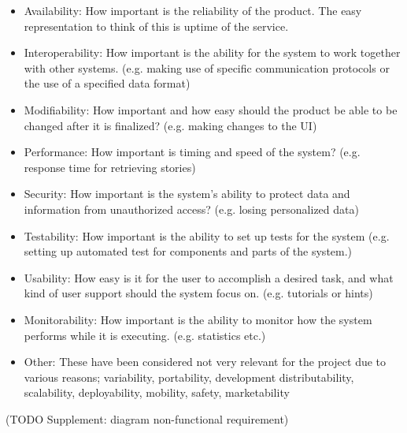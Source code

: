 \begin{itemize}
\item Availability: How important is the reliability of the product. The easy representation to think of this is uptime of the service.
\item Interoperability: How important is the ability for the system to work together with other systems. (e.g. making use of specific communication protocols or the use of a specified data format)
\item Modifiability: How important and how easy should the product be able to be changed after it is finalized? (e.g. making changes to the UI)
\item Performance: How important is timing and speed of the system? (e.g. response time for retrieving stories)
\item Security: How important is the system's ability to protect data and information from unauthorized access? (e.g. losing personalized data)
\item Testability: How important is the ability to set up tests for the system (e.g. setting up automated test for components and parts of the system.)
\item Usability: How easy is it for the user to accomplish a desired task, and what kind of user support should the system focus on. (e.g. tutorials or hints)
\item Monitorability: How important is the ability to monitor how the system performs while it is executing. (e.g. statistics etc.)
\item Other: These have been considered not very relevant for the project due to various reasons; variability, portability, development distributability, scalability, deployability, mobility, safety, marketability
\end{itemize}

(TODO Supplement: diagram non-functional requirement)

\cleardoublepage

